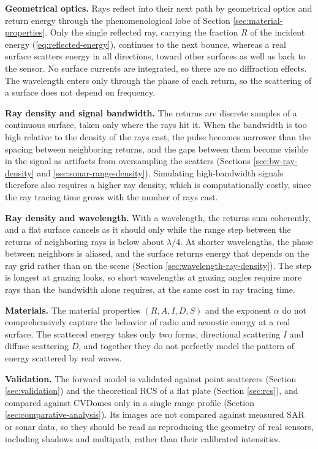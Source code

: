 \documentclass[sensors,article,submit,moreauthors]{Definitions/mdpi}
\begin{document}
\textbf{Geometrical optics.} Rays reflect into their next path by geometrical
optics and return
energy through the phenomenological lobe of Section
\ref{sec:material-properties}. Only the single
reflected ray, carrying the fraction $R$ of the incident energy
(\ref{eq:reflected-energy}),
continues to the next bounce, whereas a real surface scatters energy in all
directions, toward
other surfaces as well as back to the sensor. No surface currents are
integrated, so there are no
diffraction effects. The wavelength enters only through the phase of each
return, so the
scattering of a surface does not depend on frequency.

\textbf{Ray density and signal bandwidth.} The returns are discrete samples of a
continuous
surface, taken only where the rays hit it. When the bandwidth is too high
relative to the density of
the rays cast, the pulse becomes narrower than the spacing between neighboring
returns, and the gaps
between them become visible in the signal as artifacts from oversampling the
scatters (Sections
\ref{sec:bw-ray-density} and \ref{sec:sonar-range-density}). Simulating
high-bandwidth signals
therefore also requires a higher ray density, which is computationally costly,
since the ray
tracing time grows with the number of rays cast.

\textbf{Ray density and wavelength.} With a wavelength, the returns sum
coherently, and a flat
surface cancels as it should only while the range step between the returns of
neighboring rays is
below about $\lambda/4$. At shorter wavelengths, the phase between neighbors is
aliased, and the
surface returns energy that depends on the ray grid rather than on the scene
(Section
\ref{sec:wavelength-ray-density}). The step is longest at grazing looks, so
short wavelengths at
grazing angles require more rays than the bandwidth alone requires, at the same cost in
ray tracing time.

\textbf{Materials.} The material properties $(R,A,I,D,S)$ and the exponent
$\alpha$ do not
comprehensively capture the behavior of radio and acoustic energy at a real
surface. The scattered
energy takes only two forms, directional scattering $I$ and diffuse scattering
$D$, and together
they do not perfectly model the pattern of energy scattered by real waves.

\textbf{Validation.} The forward model is validated against point scatterers
(Section \ref{sec:validation}) and the
theoretical RCS of a flat plate (Section \ref{sec:rcs}), and compared against
CVDomes only in a
single range profile (Section \ref{sec:comparative-analysis}). Its images are
not compared against
measured SAR or sonar data, so they should
be read as reproducing the geometry of real sensors, including shadows
and
multipath, rather than their calibrated intensities.
\end{document}
